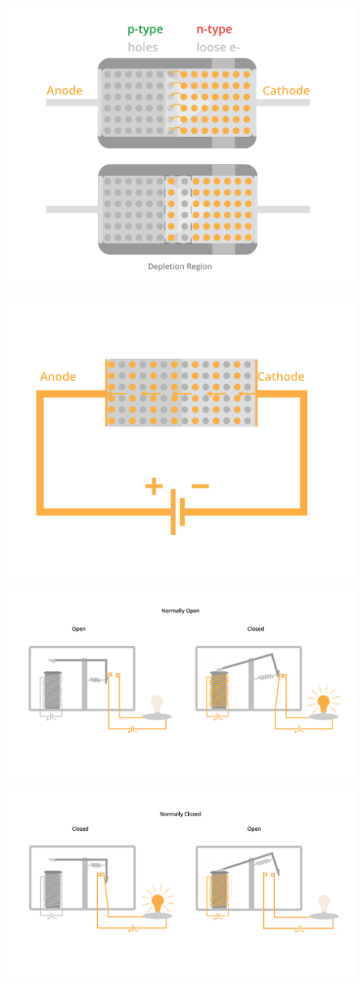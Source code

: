 \includegraphics[width=.75\textwidth]{diodeProcess-31.png}

\includegraphics[width=.75\textwidth]{diodeProcess-32.png}


\includegraphics[width=.75\textwidth]{relayFull.png}

\includegraphics[width=.75\textwidth]{relayFull2.png}

